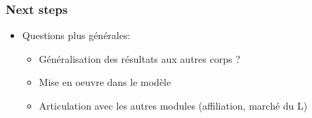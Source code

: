 \documentclass[xcolor=table,ignorenonframetext,12pt]{beamer}
\newenvironment{choixmarges}[2]{\begin{list}{}{%
\setlength{\topsep}{0pt}%
\setlength{\leftmargin}{0pt}%
\setlength{\rightmargin}{0pt}%
\setlength{\listparindent}{\parindent}%
\setlength{\itemindent}{\parindent}%
\setlength{\parsep}{0pt plus 1pt}%
\addtolength{\leftmargin}{#1}%
\addtolength{\rightmargin}{#2}%
}\item }{\end{list}}
\begin{document}
\begin{frame}

\frametitle{Next steps}

\begin{choixmarges}{-0.5cm}{-0.5cm}

\begin{itemize}

\begin{itemize}

\item Modeling choice of next rank using multichoice models
\begin{itemize}
\item Choix multiples (logit multinomial, emboité?)
\item Modèles de durée
\end{itemize}

\vspace{0.1cm}

\item Améliorer la procédure de test des modèles
\begin{itemize}
\item Sur 2011-2014 (modélisation des échelons)
\item D'autres critères d'évaluations ? 
\end{itemize}

\end{itemize}

\vspace{0.2cm}


\item Questions plus générales:
\begin{itemize}
\item Généralisation des résultats aux autres corps ?
\item Mise en oeuvre dans le modèle
\item Articulation avec les autres modules (affiliation, marché du L)
\end{itemize}

\end{itemize}



\end{choixmarges}
\end{frame}
\end{document}
